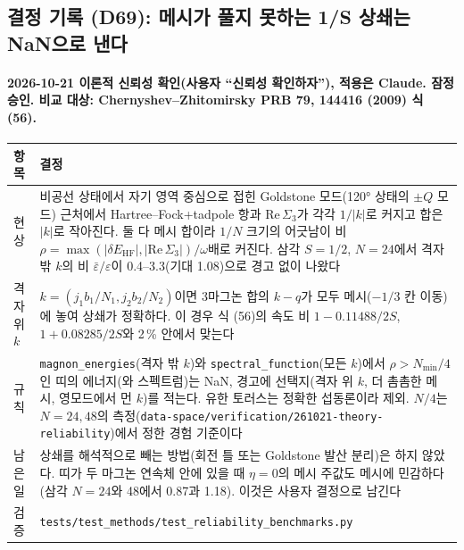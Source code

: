 \subsection{결정 기록 (D69): 메시가 풀지 못하는 1/S 상쇄는 NaN으로 낸다}\label{decisions-d69-goldstone-cancellation}
\begingroup%
  \framesubtitle{2026-10-21 이론적 신뢰성 확인(사용자 ``신뢰성 확인하자''), 적용은 Claude. 잠정 승인. 비교 대상: Chernyshev--Zhitomirsky PRB 79, 144416 (2009) 식 (56).}
  \small\renewcommand{\arraystretch}{1.12}
  \begin{tabularx}{\textwidth}{@{}P{3.0cm}Y@{}}
    \toprule
    항목 & 결정 \\
    \midrule
    현상 & 비공선 상태에서 자기 영역 중심으로 접힌 Goldstone 모드(120° 상태의 $\pm Q$ 모드) 근처에서 Hartree--Fock+tadpole 항과 $\mathrm{Re}\,\Sigma_3$가 각각 $1/|k|$로 커지고 합은 $|k|$로 작아진다. 둘 다 메시 합이라 $1/N$ 크기의 어긋남이 비 $\rho=\max(|\delta E_{\mathrm{HF}}|,|\mathrm{Re}\,\Sigma_3|)/\omega$배로 커진다. 삼각 $S=1/2$, $N=24$에서 격자 밖 $k$의 비 $\bar\varepsilon/\varepsilon$이 0.4--3.3(기대 1.08)으로 경고 없이 나왔다 \\
    격자 위 $k$ & $k=(j_1 b_1/N_1, j_2 b_2/N_2)$이면 3마그논 합의 $k-q$가 모두 메시($-1/3$ 칸 이동)에 놓여 상쇄가 정확하다. 이 경우 식 (56)의 속도 비 $1-0.11488/2S$, $1+0.08285/2S$와 2\,\% 안에서 맞는다 \\
    규칙 & \texttt{magnon\_energies}(격자 밖 $k$)와 \texttt{spectral\_function}(모든 $k$)에서 $\rho>N_{\min}/4$인 띠의 에너지(와 스펙트럼)는 NaN, 경고에 선택지(격자 위 $k$, 더 촘촘한 메시, 영모드에서 먼 $k$)를 적는다. 유한 토러스는 정확한 섭동론이라 제외. $N/4$는 $N=24, 48$의 측정(\texttt{data-space/verification/261021-theory-reliability})에서 정한 경험 기준이다 \\
    남은 일 & 상쇄를 해석적으로 빼는 방법(회전 틀 또는 Goldstone 발산 분리)은 하지 않았다. 띠가 두 마그논 연속체 안에 있을 때 $\eta=0$의 메시 주값도 메시에 민감하다(삼각 $N=24$와 48에서 0.87과 1.18). 이것은 사용자 결정으로 남긴다 \\
    검증 & \texttt{tests/test\_methods/test\_reliability\_benchmarks.py} \\
    \bottomrule
  \end{tabularx}
\endgroup

